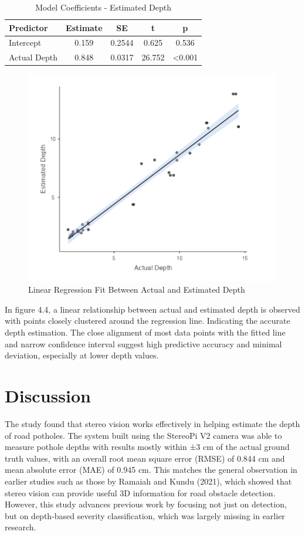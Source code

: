 \begin{table}[H]
	\centering
	\begin{tabular}{|l|c|c|c|c|}
		\hline
		\textbf{Predictor} & \textbf{Estimate} & \textbf{SE} & \textbf{t} & \textbf{p} \\
		\hline
		Intercept & 0.159 & 0.2544 & 0.625 & 0.536 \\
		Actual Depth & 0.848 & 0.0317 & 26.752 & \textless 0.001 \\
		\hline
	\end{tabular}
	\caption{Model Coefficients - Estimated Depth}
	\label{tab:model_coefficients}
\end{table}

\begin{figure}[H]
	\centering
	\includegraphics[scale=0.55]{regression.png}
	\caption{Linear Regression Fit Between Actual and Estimated Depth}
	\label{fig:model}
\end{figure}

In figure 4.4, a linear relationship between actual and estimated depth is observed with points closely clustered around the regression line. Indicating the accurate depth estimation. The close alignment of most data points with the fitted line and narrow confidence interval suggest high predictive accuracy and minimal deviation, especially at lower depth values.


\section{Discussion}
The study found that stereo vision works effectively in helping estimate the depth of road potholes. The system built using the StereoPi V2 camera was able to measure pothole depths with results mostly within ±3 cm of the actual ground truth values, with an overall root mean square error (RMSE) of 0.844 cm and mean absolute error (MAE) of 0.945 cm. This matches the general observation in earlier studies such as those by Ramaiah and Kundu (2021), which showed that stereo vision can provide useful 3D information for road obstacle detection. However, this study advances previous work by focusing not just on detection, but on depth-based severity classification, which was largely missing in earlier research.

